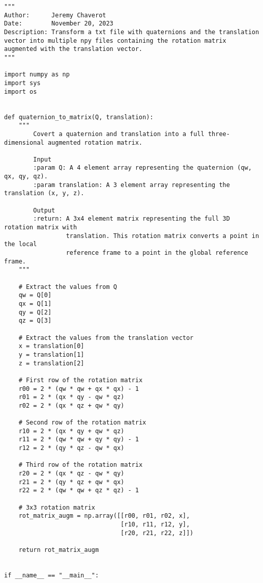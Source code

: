 \begin{lstlisting}[style=pythonstyle, label=lst:3, caption=Python script \texttt{quaternion\_to\_matrix.py} to transform a txt file with quaternions and the translation vector into multiple npy files containing the rotation matrix augmented with the translation vector.]
"""
Author:      Jeremy Chaverot
Date:        November 20, 2023
Description: Transform a txt file with quaternions and the translation vector into multiple npy files containing the rotation matrix augmented with the translation vector.
"""

import numpy as np
import sys
import os


def quaternion_to_matrix(Q, translation):
    """
        Covert a quaternion and translation into a full three-dimensional augmented rotation matrix.

        Input
        :param Q: A 4 element array representing the quaternion (qw, qx, qy, qz).
        :param translation: A 3 element array representing the translation (x, y, z).

        Output
        :return: A 3x4 element matrix representing the full 3D rotation matrix with
                 translation. This rotation matrix converts a point in the local
                 reference frame to a point in the global reference frame.
    """

    # Extract the values from Q
    qw = Q[0]
    qx = Q[1]
    qy = Q[2]
    qz = Q[3]

    # Extract the values from the translation vector
    x = translation[0]
    y = translation[1]
    z = translation[2]

    # First row of the rotation matrix
    r00 = 2 * (qw * qw + qx * qx) - 1
    r01 = 2 * (qx * qy - qw * qz)
    r02 = 2 * (qx * qz + qw * qy)

    # Second row of the rotation matrix
    r10 = 2 * (qx * qy + qw * qz)
    r11 = 2 * (qw * qw + qy * qy) - 1
    r12 = 2 * (qy * qz - qw * qx)

    # Third row of the rotation matrix
    r20 = 2 * (qx * qz - qw * qy)
    r21 = 2 * (qy * qz + qw * qx)
    r22 = 2 * (qw * qw + qz * qz) - 1

    # 3x3 rotation matrix
    rot_matrix_augm = np.array([[r00, r01, r02, x],
                                [r10, r11, r12, y],
                                [r20, r21, r22, z]])

    return rot_matrix_augm


if __name__ == "__main__":


\end{lstlisting}
